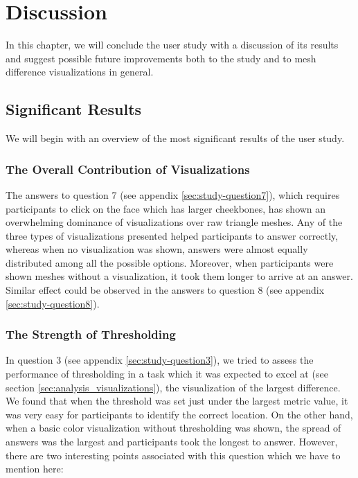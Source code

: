 \chapter{Discussion}

In this chapter, we will conclude the user study with a discussion of its results and suggest possible future improvements both to the study and to mesh difference visualizations in general.

\section{Significant Results}

We will begin with an overview of the most significant results of the user study.

\subsection{The Overall Contribution of Visualizations}

The answers to question 7 (see appendix \ref{sec:study-question7}), which requires participants to click on the face which has larger cheekbones, has shown an overwhelming dominance of visualizations over raw triangle meshes. Any of the three types of visualizations presented helped participants to answer correctly, whereas when no visualization was shown, answers were almost equally distributed among all the possible options. Moreover, when participants were shown meshes without a visualization, it took them longer to arrive at an answer. Similar effect could be observed in the answers to question 8 (see appendix \ref{sec:study-question8}).

\subsection{The Strength of Thresholding}
\label{sec:discussion-thresholding}

In question 3 (see appendix \ref{sec:study-question3}), we tried to assess the performance of thresholding in a task which it was expected to excel at (see section \ref{sec:analysis_visualizations}), the visualization of the largest difference. We found that when the threshold was set just under the largest metric value, it was very easy for participants to identify the correct location. On the other hand, when a basic color visualization without thresholding was shown, the spread of answers was the largest and participants took the longest to answer. However, there are two interesting points associated with this question which we have to mention here:

